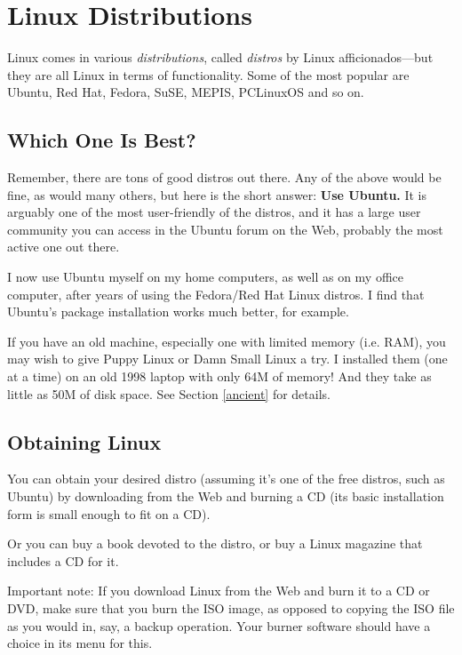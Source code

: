 \documentclass[11pt]{article}
\begin{document}
\section{Linux Distributions}

Linux comes in various {\it distributions}, called {\it distros} by
Linux afficionados---but they are all Linux in terms of functionality.
Some of the most popular are Ubuntu, Red Hat, Fedora, SuSE, MEPIS,
PCLinuxOS and so on.

\subsection{Which One Is Best?}

Remember, there are tons of good distros out there.  Any of the above
would be fine, as would many others, but here is the short answer:  {\bf
\large Use Ubuntu.}  It is arguably one of the most user-friendly of the
distros, and it has a large user community you can access in the Ubuntu
forum on the Web, probably the most active one out there.  

I now use Ubuntu myself on my home computers, as well as on my office
computer, after years of using the Fedora/Red Hat Linux distros.  I find
that Ubuntu's package installation works much better, for example.

If you have an old machine, especially one with limited memory (i.e.
RAM), you may wish to give Puppy Linux or Damn Small Linux a try.  I
installed them (one at a time) on an old 1998 laptop with only 64M of
memory!  And they take as little as 50M of disk space.  See Section
\ref{ancient} for details.

\subsection{Obtaining Linux}

You can obtain your desired distro (assuming it's one of the free
distros, such as Ubuntu)
by downloading from the Web and burning a CD (its
basic installation form is small enough to fit on a CD).

Or you can buy a book devoted to the distro, or buy a  Linux magazine
that includes a CD for it.  

Important note:  If you download Linux from the Web and burn it to a CD
or DVD, make sure that you burn the ISO image, as opposed to copying
the ISO file as you would in, say, a backup operation.  Your burner
software should have a choice in its menu for this.  
\end{document}

